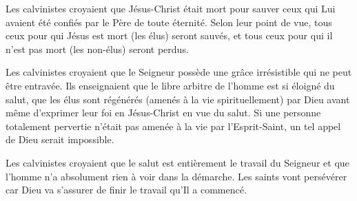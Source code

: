 Les calvinistes croyaient que Jésus-Christ était mort pour sauver
 ceux qui Lui avaient été confiés par le Père de toute éternité.
 Selon leur point de vue, tous ceux pour qui Jésus est mort (les élus) seront sauvés,
 et tous ceux pour qui il n'est pas mort (les non-élus) seront perdus.


Les calvinistes croyaient que le Seigneur possède une grâce irrésistible
 qui ne peut être entravée. Ils enseignaient que le libre arbitre de l'hom\-me
 est si éloigné du salut, que les élus sont régénérés (amenés à la vie spirituellement)
 par Dieu avant
 même d'exprimer leur foi en Jésus-Christ en vue du salut.
 Si une per\-son\-ne totalement pervertie n'était pas amenée à la vie par l'Esprit-Saint,
 un tel appel de Dieu serait impossible.


Les calvinistes croyaient que le
 salut est entièrement le travail du Seigneur
 et que l'homme n'a absolument rien à voir dans la démarche.
 Les saints vont persévérer car Dieu va s'as\-surer de finir le travail
 qu'Il a commencé.


